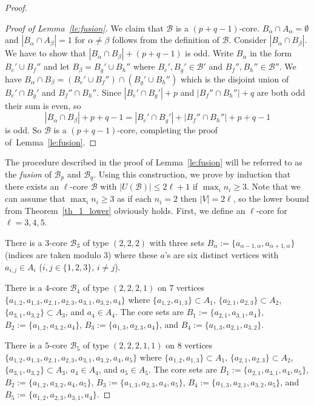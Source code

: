 \documentclass[12pt,a4paper]{amsart}
\numberwithin{equation}{section}
\theoremstyle{plain}
\theoremstyle{definition}
\def\cB{{\mathcal{B}}}
\begin{document}
\begin{proof}
\begin{proof}[Proof of Lemma~\ref{le:fusion}]
We claim that $\cB$ is a $(p+q-1)$-core.
 $B_\alpha\cap A_\alpha=\emptyset$ and $|B_\alpha\cap A_\beta|=1$ for $\alpha\neq \beta$ follows from the definition of $\cB$.
Consider $|B_\alpha \cap B_\beta|$. We have to show that $|B_\alpha \cap B_\beta| +(p+q-1)$ is odd.
Write $B_\alpha$ in the form $B_e'\cup B_f''$ and let $B_\beta=B_g'\cup B_h''$ where $B_e', B_g'\in \cB'$ and $B_f'', B_h''\in \cB''$.
We have $B_\alpha \cap B_\beta= (B_e'\cup B_f'') \cap (B_g'\cup B_h'')$ which is the disjoint union of
$B_e'\cap B_g'$ and $B_f''\cap B_h''$.
Since $|B_e'\cap B_g'|+p$ and $|B_f''\cap B_h''|+q$ are both odd their sum is even, so
$$
 |B_\alpha \cap B_\beta|+p+q-1= |B_e'\cap B_g'|+|B_f''\cap B_h''|+p+q-1$$
   is odd.
So $\cB$ is a $(p+q-1)$-core, completing the proof of~Lemma~\ref{le:fusion}.
\end{proof}

The procedure described in the proof of Lemma~\ref{le:fusion}
will be referred to as the {\em fusion} of $\cB_p$ and $\cB_q$. Using this construction, we prove by induction that there exists an $\ell$-core $\cB$ with $|U(\cB)| \leq 2\ell+1$ if $\max_{i} n_i\geq 3$. Note that we can assume that $\max_{i} n_i\geq 3$ as if each $n_i=2$ then $|V|= 2\ell$, so the lower bound from Theorem~\ref{th_1_lower} obviously holds.
First, we define an $\ell$-core for $\ell=3,4,5$.

There is a $3$-core $\cB_3$ of type $(2,2,2)$ with three sets $B_\alpha:=\{ a_{\alpha-1, \alpha}, a_{\alpha+1, \alpha}\}$ (indices are taken modulo 3) where these $a$'s are six distinct vertices with $a_{i,j}\in A_i$ ($i,j\in \{ 1,2,3\}$, $i\neq j$).

There is a $4$-core $\cB_4$ of type $(2,2,2,1)$ on $7$ vertices $\{ a_{1,2}, a_{1,3}, a_{2,1}, a_{2,3}, a_{3,1}, a_{3,2}, a_4\}$ where
  $\{ a_{1,2}, a_{1,3}\}\subset A_1$,  $\{ a_{2,1}, a_{2,3}\}\subset A_2$, $\{a_{3,1}, a_{3,2}\}\subset A_3$, and $a_4\in A_4$.
The core sets are  $B_1:=\{ a_{2,1}, a_{3,1}, a_4\}$, $B_2:=\{ a_{1,2}, a_{3,2}, a_4\}$, $B_3:=\{ a_{1,3}, a_{2,3}, a_4\}$, and $B_4:=\{ a_{1,3}, a_{2,1}, a_{3,2}\}$.

There is a $5$-core $\cB_5$ of type $(2,2,2,1,1)$ on $8$ vertices $\{ a_{1,2}, a_{1,3}, a_{2,1}, a_{2,3}, a_{3,1}, a_{3,2}, a_4, a_5\}$ where
  $\{ a_{1,2}, a_{1,3}\}\subset A_1$,  $\{ a_{2,1}, a_{2,3}\}\subset A_2$, $\{a_{3,1}, a_{3,2}\}\subset A_3$, $a_4\in A_4$, and $a_5\in A_5$.
The core sets are  $B_1:=\{ a_{2,1}, a_{3,1}, a_4, a_5\}$, $B_2:=\{ a_{1,2}, a_{3,2}, a_4, a_5\}$, $B_3:=\{ a_{1,3}, a_{2,3}, a_4, a_5\}$, $B_4:=\{ a_{1,3}, a_{2,1}, a_{3,2}, a_5\}$, and $B_5:=\{ a_{1,2}, a_{2,3}, a_{3,1}, a_4\}$.


\end{proof}
\end{document}
